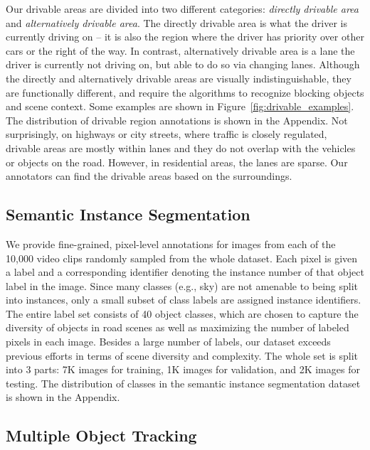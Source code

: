 Our drivable areas are divided into two different categories: \emph{directly drivable area} and \emph{alternatively drivable area}. The directly drivable area is what the driver is currently driving on -- it is also the region where the driver has priority over other cars or the right of the way. In contrast, alternatively drivable area is a lane the driver is currently not driving on, but able to do so via changing lanes. Although the directly and alternatively drivable areas are visually indistinguishable, they are functionally different, and require the algorithms to recognize blocking objects and scene context. Some examples are shown in Figure~\ref{fig:drivable_examples}. The distribution of drivable region annotations is shown in the Appendix. Not surprisingly, on highways or city streets, where traffic is closely regulated, drivable areas are mostly within lanes and they do not overlap with the vehicles or objects on the road. However, in residential areas, the lanes are sparse. Our annotators can find the drivable areas based on the surroundings.

\subsection{Semantic Instance Segmentation}

We provide fine-grained, pixel-level annotations for images from each of the 10,000 video clips randomly sampled from the whole dataset. Each pixel is given a label and a corresponding identifier denoting the instance number of that object label in the image. Since many classes (e.g., sky) are not amenable to being split into instances, only a small subset of class labels are assigned instance identifiers. The entire label set 
consists of 40 object classes, which are chosen to capture the diversity of objects in road scenes as well as maximizing the number of labeled pixels in each image. Besides a large number of labels, our dataset exceeds previous efforts in terms of scene diversity and complexity. The whole set is split into 3 parts: 7K images for training, 1K images for validation, and 2K images for testing. The distribution of classes in the semantic instance segmentation dataset is shown in the Appendix.


\subsection{Multiple Object Tracking}

